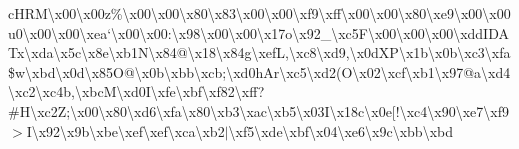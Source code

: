 c\+H\+R\+M\textbackslash{}x00\textbackslash{}x00z\%\textbackslash{}x00\textbackslash{}x00\textbackslash{}x80\textbackslash{}x83\textbackslash{}x00\textbackslash{}x00\textbackslash{}xf9\textbackslash{}xff\textbackslash{}x00\textbackslash{}x00\textbackslash{}x80\textbackslash{}xe9\textbackslash{}x00\textbackslash{}x00u0\textbackslash{}x00\textbackslash{}x00\textbackslash{}xea`\textbackslash{}x00\textbackslash{}x00\+:\textbackslash{}x98\textbackslash{}x00\textbackslash{}x00\textbackslash{}x17o\textbackslash{}x92\+\_\+\textbackslash{}xc5\+F\textbackslash{}x00\textbackslash{}x00\textbackslash{}x00\textbackslash{}xdd\+I\+D\+A\+Tx\textbackslash{}xda\textbackslash{}x5c\textbackslash{}x8e\textbackslash{}xb1\+N\textbackslash{}x84@\textbackslash{}x18\textbackslash{}x84g\textbackslash{}xef\+L,\textbackslash{}xc8\textbackslash{}xd9,\textbackslash{}x0d\+X\+P\textbackslash{}x1b\textbackslash{}x0b\textbackslash{}xc3\textbackslash{}xfa\$w\textbackslash{}xbd\textbackslash{}x0d\textbackslash{}x85\+O@\textbackslash{}x0b\textbackslash{}xbb\textbackslash{}xcb;\textbackslash{}xd0h\+Ar\textbackslash{}xc5\textbackslash{}xd2(\+O\textbackslash{}x02\textbackslash{}xcf\textbackslash{}xb1\textbackslash{}x97@a\textbackslash{}xd4\textbackslash{}xc2\textbackslash{}xc4b,\textbackslash{}xbc\+M\textbackslash{}xd0\+I\textbackslash{}xfe\textbackslash{}xbf\textbackslash{}xf82\textbackslash{}xff?\#\+H\textbackslash{}xc2\+Z;\textbackslash{}x00\textbackslash{}x80\textbackslash{}xd6\textbackslash{}xfa\textbackslash{}x80\textbackslash{}xb3\textbackslash{}xac\textbackslash{}xb5\textbackslash{}x03\+I\textbackslash{}x18c\textbackslash{}x0e\mbox{[}!\textbackslash{}xc4\textbackslash{}x90\textbackslash{}xe7\textbackslash{}xf9$>$\+I\textbackslash{}x92\textbackslash{}x9b\textbackslash{}xbe\textbackslash{}xef\textbackslash{}xef\textbackslash{}xca\textbackslash{}xb2$\vert$\textbackslash{}xf5\textbackslash{}xde\textbackslash{}xbf\textbackslash{}x04\textbackslash{}xe6\textbackslash{}x9c\textbackslash{}xbb\textbackslash{}xbd 
